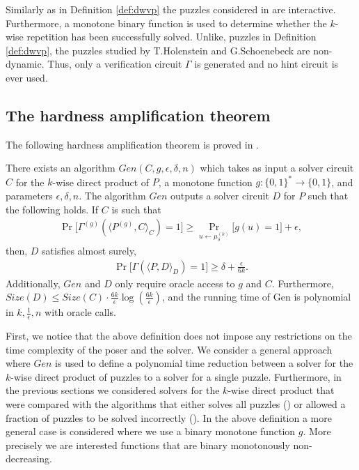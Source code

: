 Similarly as in Definition \ref{def:dwvp} the puzzles considered in \cite{DBLP:journals/corr/abs-1002-3534} are interactive.
Furthermore, a monotone binary function is used to determine whether the $k$-wise repetition
has been successfully solved. Unlike, puzzles in Definition \ref{def:dwvp}, the puzzles studied by T.Holenstein and G.Schoenebeck
are non-dynamic. Thus, only a verification circuit $\Gamma$ is generated and no hint circuit is ever used.

\subsection{The hardness amplification theorem}
The following hardness amplification theorem is proved in \cite{DBLP:journals/corr/abs-1002-3534}.
\begin{theorem}
There exists an algorithm $\mathit{Gen}(C,g,\epsilon, \delta, n)$ which takes as input a solver circuit $C$ for the $k$-wise
direct product of $P$, a monotone function $g: \{0,1\}^{*} \rightarrow \{0,1\}$, and parameters $\epsilon,\delta,n$.
The algorithm $\mathit{Gen}$ outputs a solver circuit $D$ for $P$ such that the following holds.
If $C$ is such that
\begin{align*}
\Pr\Big[\Gamma^{(g)}(\langle P^{(g)}, C \rangle_C) = 1\Big] \geq \Pr_{u \leftarrow \mu_{\delta}^{(k)}} \Big[ g(u) = 1 \Big] + \epsilon,
\end{align*}
then, $D$ satisfies almost surely,
\begin{align*}
  \Pr\Big[ \Gamma(\langle P, D\rangle_{D}) = 1\Big] \geq \delta + \frac{\epsilon}{6k}.
\end{align*}
Additionally, $\mathit{Gen}$ and $D$ only require oracle access to $g$ and $C$.
Furthermore, $\mathit{Size}(D) \leq \mathit{Size}(C) \cdot \frac{6k}{\epsilon} \log(\frac{6k}{\epsilon})$,
and the running time of Gen is polynomial in $k, \frac{1}{\epsilon}, n$ with oracle calls.
\end{theorem}

First, we notice that the above definition does not impose any restrictions on the time complexity of the poser and the solver.
We consider a general approach where $\mathit{Gen}$ is used to define a polynomial time reduction between a solver for the $k$-wise
direct product of puzzles to a solver for a single puzzle.
Furthermore, in the previous sections we considered solvers for the $k$-wise direct product that were compared with the algorithms that either
solves all puzzles (\cite{canetti2004hardness}) or allowed a fraction of puzzles to be solved incorrectly (\cite{Dodis:2009:SAI:1530441.1530450}).
In the above definition a more general case is considered where we use a binary monotone function $g$.
More precisely we are interested functions that are binary monotonously non-decreasing.

